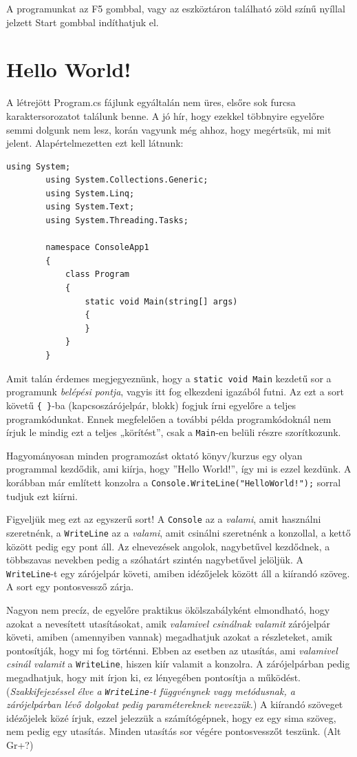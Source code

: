 \documentclass[a4paper]{article}
\begin{document}
	A programunkat az F5 gombbal, vagy az eszköztáron található zöld színű nyíllal jelzett Start gombbal indíthatjuk el.
	
	\section{Hello World!}
	A létrejött Program.cs fájlunk egyáltalán nem üres, elsőre sok furcsa karaktersorozatot találunk benne. A jó hír, hogy ezekkel többnyire egyelőre semmi dolgunk nem lesz, korán vagyunk még ahhoz, hogy megértsük, mi mit jelent. Alapértelmezetten ezt kell látnunk:
	
	\begin{lstlisting}[caption=Hello World!, label=lst:hello]
		using System;
		using System.Collections.Generic;
		using System.Linq;
		using System.Text;
		using System.Threading.Tasks;
		
		namespace ConsoleApp1
		{
			class Program
			{
				static void Main(string[] args)
				{
				}
			}
		}
	\end{lstlisting}
	
	Amit talán érdemes megjegyeznünk, hogy a \lstinline{static void Main} kezdetű sor a programunk \emph{belépési pontja}, vagyis itt fog elkezdeni igazából futni. Az ezt a sort követű \lstinline!{ }!-ba (kapcsoszárójelpár, blokk) fogjuk írni egyelőre a teljes programkódunkat. Ennek megfelelően a további példa programkódoknál nem írjuk le mindig ezt a teljes „körítést”, csak a \lstinline{Main}-en belüli részre szorítkozunk.
	
	Hagyományosan minden programozást oktató könyv/kurzus egy olyan programmal kezdődik, ami kiírja, hogy ”Hello World!”, így mi is ezzel kezdünk. A korábban már említett konzolra a \lstinline{Console.WriteLine("HelloWorld!");} sorral tudjuk ezt kiírni.
	
	Figyeljük meg ezt az egyszerű sort! A \lstinline{Console} az a \emph{valami}, amit használni szeretnénk, a \lstinline{WriteLine} az a \emph{valami}, amit csinálni szeretnénk a konzollal, a kettő között pedig egy pont áll. Az elnevezések angolok, nagybetűvel kezdődnek, a többszavas nevekben pedig a szóhatárt szintén nagybetűvel jelöljük. A \lstinline{WriteLine}-t egy zárójelpár követi, amiben idézőjelek között áll a kiírandó szöveg. A sort egy pontosvessző zárja.
	
	Nagyon nem precíz, de egyelőre praktikus ökölszabályként elmondható, hogy azokat a nevesített utasításokat, amik \emph{valamivel csinálnak valamit} zárójelpár követi, amiben (amennyiben vannak) megadhatjuk azokat a részleteket, amik pontosítják, hogy mi fog történni. Ebben az esetben az utasítás, ami \emph{valamivel csinál valamit} a \lstinline{WriteLine}, hiszen kiír valamit a konzolra. A zárójelpárban pedig megadhatjuk, hogy mit írjon ki, ez lényegében pontosítja a működést. (\emph{Szakkifejezéssel élve a \lstinline{WriteLine}-t függvénynek vagy metódusnak, a zárójelpárban lévő dolgokat pedig paramétereknek nevezzük.}) A kiírandó szöveget idézőjelek közé írjuk, ezzel jelezzük a számítógépnek, hogy ez egy sima szöveg, nem pedig egy utasítás. Minden utasítás sor végére pontosvesszőt teszünk. (Alt Gr+?)
	
\end{document}
